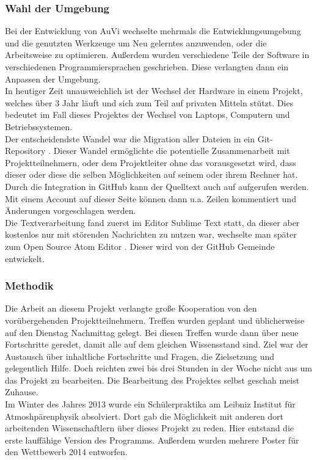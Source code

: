 \subsubsection{Wahl der Umgebung}\label{sec:ent} %
Bei der Entwicklung von AuVi wechselte mehrmals die Entwicklungsumgebung und die
genutzten Werkzeuge um Neu gelerntes anzuwenden, oder die Arbeitsweise zu optimieren.
Außerdem wurden verschiedene Teile der Software in verschiedenen Programmiersprachen
geschrieben. Diese verlangten dann ein Anpassen der Umgebung.\\
In heutiger Zeit unausweichlich ist der Wechsel der Hardware in einem Projekt,
welches über 3 Jahr läuft und sich zum Teil auf privaten Mitteln stützt. Dies
bedeutet im Fall dieses Projektes der Wechsel von Laptops,
Computern und Betriebssystemen.\\
Der entscheidendste Wandel war die Migration aller Dateien in ein Git-Repository \cite{gitrepo}.
Dieser Wandel ermöglichte die potentielle Zusammenarbeit mit Projektteilnehmern, oder
dem Projektleiter ohne das vorausgesetzt wird, dass dieser oder diese die selben Möglichkeiten
auf seinem oder ihrem Rechner hat. Durch die Integration in GitHub kann der Quelltext auch auf
 aufgerufen werden. Mit einem Account auf dieser
Seite können dann u.a. Zeilen kommentiert und Änderungen vorgeschlagen werden. \\
Die Textverarbeitung fand zuerst im Editor Sublime Text \cite{sublime} statt, da dieser
aber kostenlos nur mit störenden Nachrichten zu nutzen war, wechselte man später
zum Open Source Atom Editor \cite{atomio}. Dieser wird von der GitHub Gemeinde entwickelt.

\subsubsection{Methodik} %
Die Arbeit an diesem Projekt verlangte große Kooperation
von den vorübergehenden Projektteilnehmern.
Treffen wurden geplant und üblicherweise auf den Dienstag Nachmittag gelegt.
Bei diesen Treffen wurde dann über neue Fortschritte geredet,
damit alle auf dem gleichen Wissensstand sind.
Ziel war der Austausch über inhaltliche Fortschritte und Fragen, die Zielsetzung und
gelegentlich Hilfe.
Doch reichten zwei bis drei Stunden in der Woche nicht aus um das Projekt zu bearbeiten.
Die Bearbeitung des Projektes selbst geschah meist Zuhause.\\
Im Winter des Jahres 2013 wurde ein Schülerpraktika am
Leibniz Institut für Atmoshpärenphysik absolviert.
Dort gab die Möglichkeit mit anderen dort arbeitenden
Wissenschaftlern über dieses Projekt zu reden.
Hier entstand die erste lauffähige Version des Programms.
Außerdem wurden mehrere Poster für den \jf Wettbewerb 2014 entworfen.

